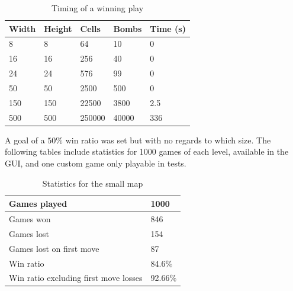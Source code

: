 \documentclass[11pt,a4paper,notitlepage]{article}
\theoremstyle{definition}
\begin{document}
\begin{table}[H]
\begin{center}
\begin{tabular}{|l|l|l|l|l|}
\hline
Width & Height & Cells & Bombs & Time (s) \\
\hline
8 & 8 & 64 & 10 & 0 \\
\hline
16 & 16 & 256 & 40 & 0 \\
\hline
24 & 24 & 576 & 99 & 0 \\
\hline
50 & 50 & 2500 & 500 & 0 \\
\hline
150 & 150 & 22500 & 3800 & 2.5 \\
\hline
500 & 500 & 250000 & 40000 & 336 \\
\hline
\end{tabular}
\end{center}
\caption{Timing of a winning play}
\label{table:time}
\end{table}

A goal of a $50\%$ win ratio was set but with no regards to which size. The following tables include statistics for 1000 games of each level, available in the GUI, and one custom game only playable in tests.

\begin{table}[H]
\begin{center}
\begin{tabular}{l|l}
Games played &  1000 \\
\hline
Games won &  846 \\
\hline
Games lost &  154 \\
\hline
Games lost on first move & 87 \\
\hline
Win ratio & 84.6\% \\
\hline
Win ratio excluding first move losses & 92.66\% \\
\end{tabular}
\end{center}
\caption{Statistics for the small map}
\label{table:sstat}
\end{table}
\end{document}
